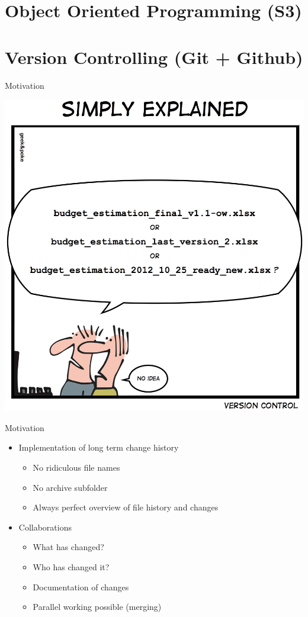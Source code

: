 \documentclass{beamer}\usepackage[]{graphicx}\usepackage[]{color}
\begin{document}
\section{Object Oriented Programming (S3)}

\section{Version Controlling (Git + Github)}
\begin{frame}{Motivation}
\begin{center}
\includegraphics[height=.75\textheight]{why_version_control.jpg}
\end{center}
\end{frame}

\begin{frame}{Motivation}
\begin{itemize}
  \item Implementation of long term change history 
  \begin{itemize}
  \item No ridiculous file names
  \item No archive subfolder
  \item Always perfect overview of file history and changes
  \end{itemize}
  \item Collaborations
  \begin{itemize}
  \item What has changed?
  \item Who has changed it?
  \item Documentation of changes
  \item Parallel working possible (merging)
  \end{itemize}
\end{itemize}
\end{frame}
\end{document}
